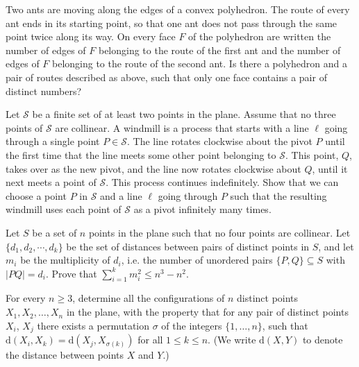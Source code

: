 \documentclass[11pt]{scrartcl}
\begin{document}
\begin{problem} 
    	Two ants are moving along the edges of a convex polyhedron. The route of every ant ends in its starting point, so that one ant does not pass through the same point twice along its way. On every face $F$ of the polyhedron are written the number of edges of $F$ belonging to the route of the first ant and the number of edges of $F$ belonging to the route of the second ant. Is there a polyhedron and a pair of routes described as above, such that only one face contains a pair of distinct numbers?
\end{problem}

\begin{problem} [IMO 2011/2]
    Let $\mathcal{S}$ be a finite set of at least two points in the plane. Assume that no three points of $\mathcal S$ are collinear. A windmill is a process that starts with a line $\ell$ going through a single point $P \in \mathcal S$. The line rotates clockwise about the pivot $P$ until the first time that the line meets some other point belonging to $\mathcal S$. This point, $Q$, takes over as the new pivot, and the line now rotates clockwise about $Q$, until it next meets a point of $\mathcal S$. This process continues indefinitely.
Show that we can choose a point $P$ in $\mathcal S$ and a line $\ell$ going through $P$ such that the resulting windmill uses each point of $\mathcal S$ as a pivot infinitely many times.
\end{problem}

\begin{problem} 
    Let $S$ be a set of $n$ points in the plane such that no four points are collinear. Let $\{d_1,d_2,\cdots ,d_k\}$ be the set of distances between pairs of distinct points in $S$, and let $m_i$ be the multiplicity of $d_i$, i.e. the number of unordered pairs $\{P,Q\}\subseteq S$ with $|PQ|=d_i$. Prove that $\sum_{i=1}^k m_i^2\leq n^3-n^2$.
\end{problem}

\begin{problem} [RMM 2011/5]
    	For every $n\geq 3$, determine all the configurations of $n$ distinct points $X_1,X_2,\ldots,X_n$ in the plane, with the property that for any pair of distinct points $X_i$, $X_j$ there exists a permutation $\sigma$ of the integers $\{1,\ldots,n\}$, such that $\textrm{d}(X_i,X_k) = \textrm{d}(X_j,X_{\sigma(k)})$ for all $1\leq k \leq n$.
(We write $\textrm{d}(X,Y)$ to denote the distance between points $X$ and $Y$.)
\end{problem}
\end{document}
